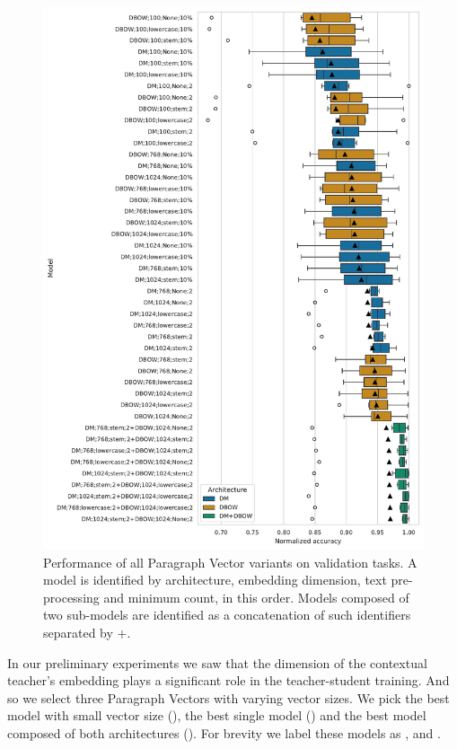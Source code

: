 \begin{figure}

    \includegraphics[width=\textwidth]{./img/pv_val_scores.pdf}

    \caption{Performance of all Paragraph Vector variants on validation tasks.
    A model is identified by architecture, embedding dimension, text
    pre-processing and minimum count, in this order. Models composed of two
    sub-models are identified as a concatenation of such identifiers separated
    by $+$.}

    \label{fig:pv_val_scores}

\end{figure}

In our preliminary experiments we saw that the dimension of the contextual
teacher's embedding plays a significant role in the teacher-student training.
And so we select three Paragraph Vectors with varying vector sizes. We pick the
best model with small vector size (), the best
single model () and the best model composed of both
architectures (). For brevity we label
these models as ,  and .

